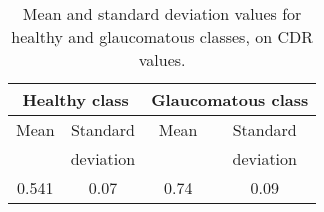 \begin{table}
\begin{tabular}{|c|c|c|c|}
 \hline
 \multicolumn{2}{|c|}{Healthy class} & \multicolumn{2}{c|}{Glaucomatous class} \\
 \hline
 Mean & Standard & Mean & Standard  \\
 {} & deviation & {} & deviation \\
 \hline
 0.541 & 0.07 & 0.74 & 0.09 \\
 \hline
\end{tabular}
\caption{\label{table_cdr_values} Mean and standard deviation values for healthy and glaucomatous classes, on CDR values.}
\end{table}